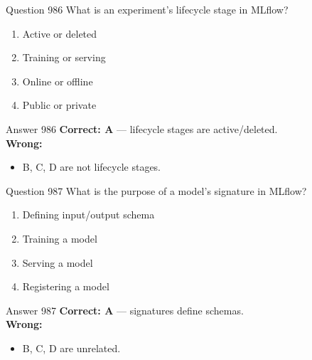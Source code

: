 \documentclass[aspectratio=169,11pt]{beamer}
\begin{document}
	\begin{frame}{Question 986}
		What is an experiment's lifecycle stage in MLflow?
		\begin{enumerate}[label=\Alph*.]
			\item Active or deleted
			\item Training or serving
			\item Online or offline
			\item Public or private
		\end{enumerate}
	\end{frame}
	\begin{frame}{Answer 986}
		\textbf{Correct: A} --- lifecycle stages are active/deleted.\\
		\vspace{0.5em}
		\textbf{Wrong:}
		\begin{itemize}
			\item B, C, D are not lifecycle stages.
		\end{itemize}
	\end{frame}
	
	\begin{frame}{Question 987}
		What is the purpose of a model's signature in MLflow?
		\begin{enumerate}[label=\Alph*.]
			\item Defining input/output schema
			\item Training a model
			\item Serving a model
			\item Registering a model
		\end{enumerate}
	\end{frame}
	\begin{frame}{Answer 987}
		\textbf{Correct: A} --- signatures define schemas.\\
		\vspace{0.5em}
		\textbf{Wrong:}
		\begin{itemize}
			\item B, C, D are unrelated.
		\end{itemize}
	\end{frame}
	
\end{document}
